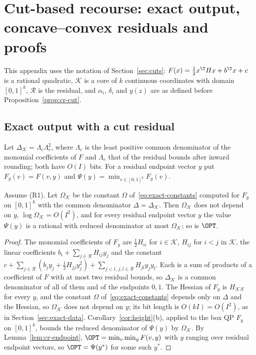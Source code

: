 \section{Cut-based recourse: exact output, concave--convex residuals and proofs}\label{app:recourse-cuts}

This appendix uses the notation of Section~\ref{sec:cuts}:
$F(x)=\frac12x^{\T}Hx+b^{\T}x+c$ is a rational quadratic, $\mathcal K$ is a
core of $k$ continuous coordinates with domain $[0,1]^k$, $\mathcal R$ is the
residual, and $\alpha_i$, $\delta_i$ and $y(z)$ are as defined before
Proposition~\ref{prop:cr-cut}.

\subsection{Exact output with a cut residual}

Let $\Delta_{\mathcal K}=\Lambda_c\Lambda_e^2$, where $\Lambda_c$ is the
least positive common denominator of the monomial coefficients of $F$ and
$\Lambda_e$ that of the residual bounds after inward rounding; both have
$O(I)$ bits. For a residual
endpoint vector $y$ put $F_y(v)=F(v,y)$ and
$\Psi(y)=\min_{v\in[0,1]^k}F_y(v)$.

\begin{lemma}\label{lem:cr-height}
Assume (R1). Let $\Omega_{\mathcal K}$ be the constant $\Omega$
of~\eqref{eq:exact-constants} computed for $F_y$ on $[0,1]^k$ with the
common denominator $\Delta=\Delta_{\mathcal K}$. Then $\Omega_{\mathcal K}$
does not depend on $y$, $\log\Omega_{\mathcal K}=O(I^2)$, and for every
residual endpoint vector $y$ the value $\Psi(y)$ is a rational with reduced
denominator at most $\Omega_{\mathcal K}$; so is $\OPT$.
\end{lemma}

\begin{proof}
The monomial coefficients of $F_y$ are $\frac12H_{ii}$ for $i\in\mathcal K$,
$H_{ij}$ for $i<j$ in $\mathcal K$, the linear coefficients
$b_i+\sum_{j\in\mathcal R}H_{ij}y_j$ and the constant
$c+\sum_{j\in\mathcal R}(b_jy_j+\frac12H_{jj}y_j^2)
+\sum_{j<l,\,j,l\in\mathcal R}H_{jl}y_jy_l$. Each is a sum of products of a
coefficient of $F$ with at most two residual bounds, so $\Delta_{\mathcal K}$
is a common denominator of all of them and of the endpoints $0,1$. The
Hessian of $F_y$ is $H_{\mathcal K\mathcal K}$ for every $y$, and the
constant $\Omega$ of~\eqref{eq:exact-constants} depends only on $\Delta$ and
the Hessian, so $\Omega_{\mathcal K}$ does not depend on $y$; its bit
length is $O(kI)=O(I^2)$, as in Section~\ref{sec:exact-data}.
Corollary~\ref{cor:height}(b), applied to the box QP $F_y$ on
$[0,1]^k$, bounds the reduced denominator of $\Psi(y)$ by
$\Omega_{\mathcal K}$. By Lemma~\ref{lem:cr-endpoint},
$\OPT=\min_v\min_{y}F(v,y)$ with $y$ ranging over residual endpoint vectors,
so $\OPT=\Psi(y^*)$ for some such $y^*$.
\end{proof}

